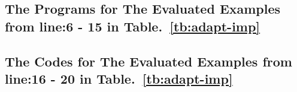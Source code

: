 \subsection{The Programs for The Evaluated Examples from line:6 - 15 in Table.~\ref{tb:adapt-imp}}
\label{apdx:evaluated_examples}

\subsection{The Codes for The Evaluated  Examples from line:16 - 20 in Table.~\ref{tb:adapt-imp}}
\label{apdx:evaluated_codes}


% 